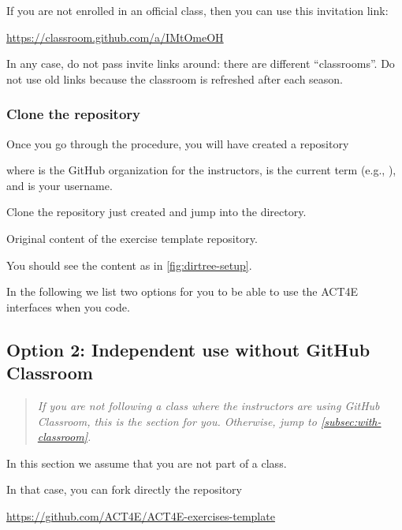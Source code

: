If you are not enrolled in an official class, then you can use this invitation link:

\url{https://classroom.github.com/a/IMtOmeOH}

In any case, do not pass invite links around: there are different ``classrooms''.
Do not use old links because the classroom is refreshed after each season.

\subsubsection{Clone the repository}

Once you go through the procedure, you will have created a repository
% 
\begin{quote}
\end{quote}
where  is the GitHub organization for the instructors,  is the current term (e.g., ), and  is your username.

Clone the repository just created and jump into the directory.

\begin{marginfigure}
    \caption{Original content of the exercise template repository.}
    \label{fig:dirtree-setup}
\end{marginfigure}

You should see the content as in \cref{fig:dirtree-setup}.

In the following we list two options for you to be able to use the ACT4E interfaces when you code.

\subsection{Option 2: Independent use without GitHub Classroom}
\label{subsec:without-classroom}

\begin{quote}
    \emph{
        If you are \emph{not} following a class where the instructors are using GitHub Classroom,
        this is the section for you.
        Otherwise, jump to \cref{subsec:with-classroom}.
    }
\end{quote}

In this section we assume that you are not part of a class.

In that case, you can fork directly the repository

\url{https://github.com/ACT4E/ACT4E-exercises-template}

